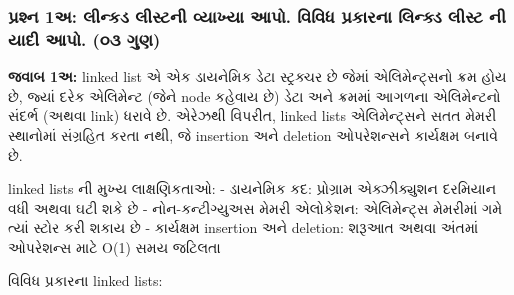 \documentclass{article}
\begin{document}
\subsubsection{પ્રશ્ન 1અ: લીન્કડ લીસ્ટની વ્યાખ્યા આપો. વિવિધ પ્રકારના લિન્ક્ડ
લીસ્ટ ની યાદી આપો. (૦૩
ગુણ)}\label{uxaaauxab0uxab6uxaa8-1uxa85-uxab2uxaa8uxa95uxaa1-uxab2uxab8uxa9fuxaa8-uxab5uxaafuxa96uxaaf-uxa86uxaaa.-uxab5uxab5uxaa7-uxaaauxab0uxa95uxab0uxaa8-uxab2uxaa8uxa95uxaa1-uxab2uxab8uxa9f-uxaa8-uxaafuxaa6-uxa86uxaaa.-uxae6uxae9-uxa97uxaa3}

\textbf{જવાબ 1અ:} linked list એ એક ડાયનેમિક ડેટા સ્ટ્રક્ચર છે જેમાં એલિમેન્ટ્સનો
ક્રમ હોય છે, જ્યાં દરેક એલિમેન્ટ (જેને node કહેવાય છે) ડેટા અને ક્રમમાં આગળના એલિમેન્ટનો
સંદર્ભ (અથવા link) ધરાવે છે. એરેઝથી વિપરીત, linked lists એલિમેન્ટ્સને સતત મેમરી
સ્થાનોમાં સંગ્રહિત કરતા નથી, જે insertion અને deletion ઓપરેશન્સને કાર્યક્ષમ બનાવે છે.

linked lists ની મુખ્ય લાક્ષણિકતાઓ: - ડાયનેમિક કદ: પ્રોગ્રામ એક્ઝીક્યુશન દરમિયાન
વધી અથવા ઘટી શકે છે - નોન-કન્ટીગ્યુઅસ મેમરી એલોકેશન: એલિમેન્ટ્સ મેમરીમાં ગમે ત્યાં સ્ટોર
કરી શકાય છે - કાર્યક્ષમ insertion અને deletion: શરૂઆત અથવા અંતમાં ઓપરેશન્સ માટે
O(1) સમય જટિલતા

વિવિધ પ્રકારના linked lists:
\end{document}
